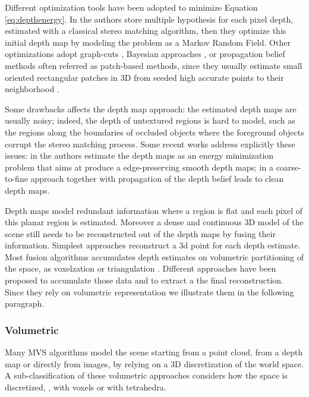 Different optimization tools have been adopted to minimize Equation \eqref{eq:depthenergy}. 
In \cite{campbell2008using} the authors store multiple hypothesis for each pixel depth, estimated with a classical stereo matching algorithm, then they optimize this initial depth map by modeling the problem as a Markov Random Field. Other optimizations adopt graph-cuts \cite{kolmogorov2002multi}, Bayesian approaches \cite{strecha2006combined,gargallo2005bayesian}, or propagation belief methods often referred as patch-based methods, since they usually estimate small oriented rectangular patches in 3D from seeded high accurate points to their neighborhood \cite{fu10,goesele2007multi,Tola12,bleyer2011patchmatch,heise2013pm}.




Some drawbacks affects the depth map approach: the estimated depth maps are usually noisy; indeed, the depth of untextured regions is hard to model, such as the regions along the boundaries of occluded objects where the foreground objects corrupt the stereo matching process.
Some recent works address explicitly these issues:
in \cite{semerjian2014new} the authors estimate the depth maps as an energy minimization problem that aims at produce a edge-preserving smooth depth maps; in \cite{wei2014multi} a coarse-to-fine approach together with propagation of the depth belief leads to clean depth maps.

Depth maps model redundant information where a region is flat and each pixel of this planar region is estimated. 
Moreover a dense and continuous 3D model of the scene still needs to be reconstructed out of the depth maps by fusing their information.
Simplest approaches reconstruct a 3d point for each depth estimate.
Most fusion algorithms accumulates depth estimates on volumetric partitioning of the space, as voxelzation \cite{curless1996volumetric} or triangulation   \cite{bradley2008accurate,labatut2007efficient,vu_et_al_2012}. 
Different approaches have been proposed to accumulate those data and to extract a the final reconstruction. Since they rely on volumetric representation we illustrate them in the following paragraph.

\subsubsection{Volumetric}
Many MVS algorithms model the scene starting from a point cloud, from a depth map or directly from images, by relying on a 3D discretization of the world space.
A sub-classification of these volumetric approaches considers how the space is discretized, \ie, with voxels or with tetrahedra.


